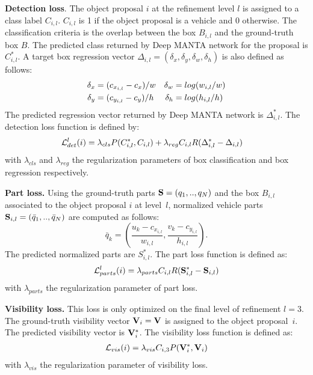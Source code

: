 \documentclass[10pt,twocolumn,letterpaper]{article}
\begin{document}
\textbf{Detection loss}. The object proposal $i$ at the refinement level $l$ is assigned to a class label $C_{i,l}$. $C_{i,l}$ is 1 if the object proposal is a vehicle and 0 otherwise. The classification criteria is the overlap between the box $B_{i,l}$ and the ground-truth box $B$. The predicted class returned by Deep MANTA network for the proposal is $C^*_{i,l}$. A target box regression vector  $\Delta_{i,l} = (\delta_x, \delta_y, \delta_w, \delta_h)$ is also defined as follows:
\begin{align}
\delta_x &= (c_{x_{i,l}}-c_x)/w &  \delta_w &= log(w_{i,l}/w)\notag \\ 
\delta_y &= (c_{y_{i,l}}-c_y)/h &  \delta_h &= log(h_{i,l}/h)  \notag
\end{align}
The predicted regression vector returned by Deep MANTA network is $\Delta_{i,l}^*$. The detection loss function is defined by:
\begin{align}
\mathcal{L}_{det}^l(i) & = \lambda_{cls} P(C_{i,l}^*,C_{i,l})+ \lambda_{reg} C_{i,l} R(\Delta_{i,l}^*- \Delta_{i,l}) \notag
\end{align}
with $\lambda_{cls}$ and $\lambda_{reg}$ the regularization parameters of box classification and box regression respectively. 


\textbf{Part loss.} Using the ground-truth parts $\bold{S}=(q_1,.., q_N)$ and the box $B_{i,l}$ associated to the object proposal $i$ at level~$l$, normalized vehicle parts $\bold{S}_{i,l} = (\bar q_1,.., \bar q_N)$ are computed as follows:
\[
\bar q_k = (\frac{u_k-c_{x_{i,l}}}{w_{i,l}} ,\frac{v_k-c_{y_{i,l}}}{h_{i,l}}).
\]
The predicted normalized parts are $S^*_{i,l}$. The part loss function is defined as:
\begin{align}
\mathcal{L}_{parts}^l(i) = \lambda_{parts} C_{i,l} R(\bold{S}_{i,l}^*- \bold{S}_{i,l}) \notag
\end{align}
with $\lambda_{parts}$ the regularization parameter of part loss.

\textbf{Visibility loss.} This loss is only optimized on the final level of refinement $l=3$. The ground-truth visibility vector $\bold{V}_{i} = \bold{V}$ is assigned to the object proposal~$i$. The predicted visibility vector is $\bold{V}^*_{i}$. The visibility loss function is defined as:
\begin{align}
\mathcal{L}_{vis}(i) = \lambda_{vis}  C_{i,3} P(\bold{V}_{i}^*,\bold{V}_{i}) \notag
\end{align}
with $\lambda_{vis}$ the regularization parameter of visibility loss.
\end{document}
